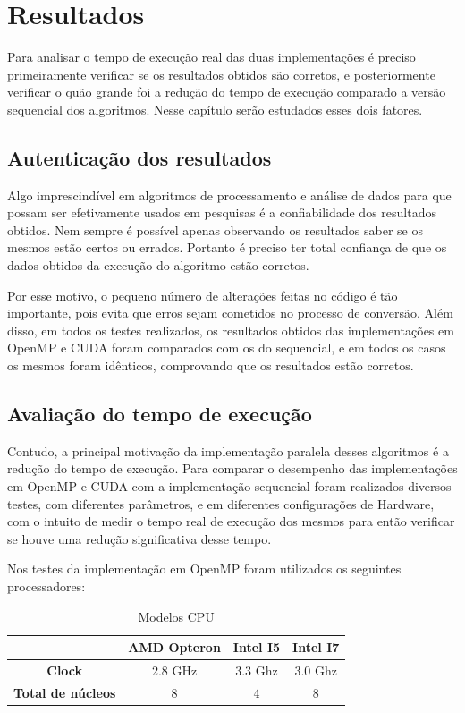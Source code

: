 \chapter{Resultados}

Para analisar o tempo de execução real das duas implementações é preciso primeiramente verificar se os resultados obtidos são corretos, e posteriormente verificar o quão grande foi a redução do tempo de execução comparado a versão sequencial dos algoritmos. Nesse capítulo serão estudados esses dois fatores.

\section{Autenticação dos resultados}

Algo imprescindível em algoritmos de processamento e análise de dados para que possam ser efetivamente usados em pesquisas é a confiabilidade dos resultados obtidos. Nem sempre é possível apenas observando os resultados saber se os mesmos estão certos ou errados. Portanto é preciso ter total confiança de que os dados obtidos da execução do algoritmo estão corretos.

Por esse motivo, o pequeno número de alterações feitas no código é tão importante, pois evita que erros sejam cometidos no processo de conversão. Além disso, em todos os testes realizados, os resultados obtidos das implementações em OpenMP e CUDA foram comparados com os do sequencial, e em todos os casos os mesmos foram idênticos, comprovando que os resultados estão corretos.

\section{Avaliação do tempo de execução}

Contudo, a principal motivação da implementação paralela desses algoritmos é a redução do tempo de execução. Para comparar o desempenho das implementações em OpenMP e CUDA com a implementação sequencial foram realizados diversos testes, com diferentes parâmetros, e em diferentes configurações de Hardware, com o intuito de medir o tempo real de execução dos mesmos para então verificar se houve uma redução significativa desse tempo.

Nos testes da implementação em OpenMP foram utilizados os seguintes processadores:

\begin{table}[H]
\caption{Modelos CPU}
\begin{center}
\begin{tabular}{cccc}
 & \textbf{AMD Opteron} & \textbf{Intel I5} & \textbf{Intel I7} \\
\hline\hline
\textbf{Clock}				& 2.8 GHz	& 3.3 Ghz	& 3.0 Ghz \\
\textbf{Total de núcleos}	& 8			& 4			& 8
\end{tabular} 
\end{center}
\end{table}

